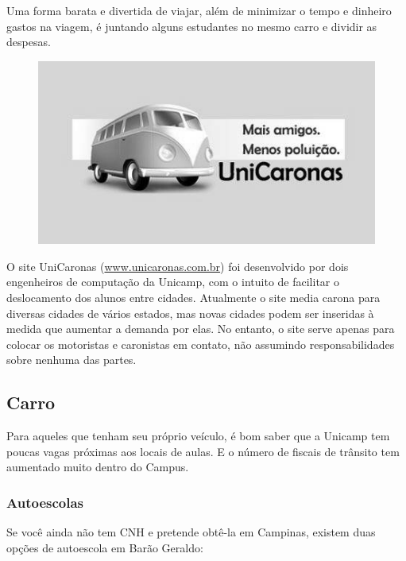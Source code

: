 Uma forma barata e divertida de viajar, além de minimizar o tempo e dinheiro
gastos na viagem, é juntando alguns estudantes no mesmo carro e dividir as
despesas.
\begin{figure}[h!]
    \centering
    \includegraphics[scale=0.55,keepaspectratio=true]{img/imgs/8-transporte/unicaronas.jpg}
\end{figure}


O site UniCaronas (\url{www.unicaronas.com.br}) foi desenvolvido por dois
engenheiros de computação da Unicamp, com o intuito de facilitar o deslocamento
dos alunos entre cidades. Atualmente o site media carona para diversas cidades
de vários estados, mas novas cidades podem ser inseridas à medida que aumentar
a demanda por elas. No entanto, o site serve apenas para colocar os motoristas
e caronistas em contato, não assumindo responsabilidades sobre nenhuma das
partes.

\subsection{Carro}

Para aqueles que tenham seu próprio veículo, é bom saber que a Unicamp tem
poucas vagas próximas aos locais de aulas. E o número de fiscais de trânsito tem
aumentado muito dentro do Campus.

\subsubsection{Autoescolas}

Se você ainda não tem CNH e pretende obtê-la em Campinas, existem duas opções de
autoescola em Barão Geraldo:

